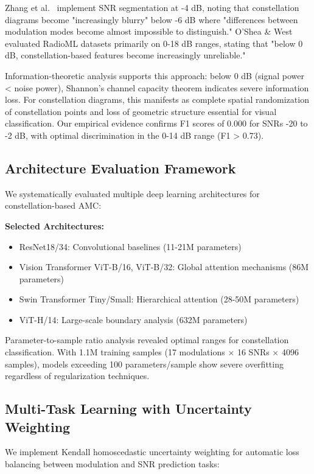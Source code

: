 \documentclass{ELSP}
\begin{document}
{{Zhang et al.~\cite{zhang2023multimodal} implement SNR segmentation at -4 dB, noting that constellation diagrams become "increasingly blurry" below -6 dB where "differences between modulation modes become almost impossible to distinguish." O'Shea \& West~\cite{oshea2016} evaluated RadioML datasets primarily on 0-18 dB ranges, stating that "below 0 dB, constellation-based features become increasingly unreliable."

Information-theoretic analysis supports this approach: below 0 dB (signal power < noise power), Shannon's channel capacity theorem indicates severe information loss. For constellation diagrams, this manifests as complete spatial randomization of constellation points and loss of geometric structure essential for visual classification. Our empirical evidence confirms F1 scores of 0.000 for SNRs -20 to -2 dB, with optimal discrimination in the 0-14 dB range (F1 > 0.73).

\subsection{Architecture Evaluation Framework}

We systematically evaluated multiple deep learning architectures for constellation-based AMC:

\textbf{Selected Architectures:}
\begin{itemize}
    \item ResNet18/34: Convolutional baselines (11-21M parameters)
    \item Vision Transformer ViT-B/16, ViT-B/32: Global attention mechanisms (86M parameters)
    \item Swin Transformer Tiny/Small: Hierarchical attention (28-50M parameters)
    \item ViT-H/14: Large-scale boundary analysis (632M parameters)
\end{itemize}

Parameter-to-sample ratio analysis revealed optimal ranges for constellation classification. With 1.1M training samples (17 modulations × 16 SNRs × 4096 samples), models exceeding 100 parameters/sample show severe overfitting regardless of regularization techniques.

\subsection{Multi-Task Learning with Uncertainty Weighting}

We implement Kendall homoscedastic uncertainty weighting for automatic loss balancing between modulation and SNR prediction tasks:

}}
\end{document}
